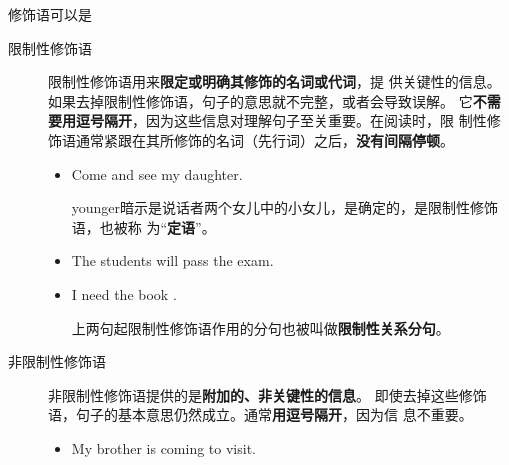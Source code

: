 修饰语可以是
\begin{description}
\item[限制性修饰语] 限制性修饰语用来\textbf{限定或明确其修饰的名词或代词}，提
  供关键性的信息。如果去掉限制性修饰语，句子的意思就不完整，或者会导致误解。
  它\textbf{不需要用逗号隔开}，因为这些信息对理解句子至关重要。在阅读时，限
  制性修饰语通常紧跟在其所修饰的名词（先行词）之后，\textbf{没有间隔停顿}。
  \begin{itemize}

  \item Come and see my  daughter.

    younger暗示是说话者两个女儿中的小女儿，是确定的，是限制性修饰语，也被称
    为“\textbf{定语}”。

  \item The students  will pass the exam.

  \item I need the book .

    上两句起限制性修饰语作用的分句也被叫做\textbf{限制性关系分句}。

  \end{itemize}


\item[非限制性修饰语] 非限制性修饰语提供的是\textbf{附加的、非关键性的信息}。
  即使去掉这些修饰语，句子的基本意思仍然成立。通常\textbf{用逗号隔开}，因为信
  息不重要。
  \begin{itemize}
  \item My brother is coming to visit.
  \end{itemize}

\end{description}

